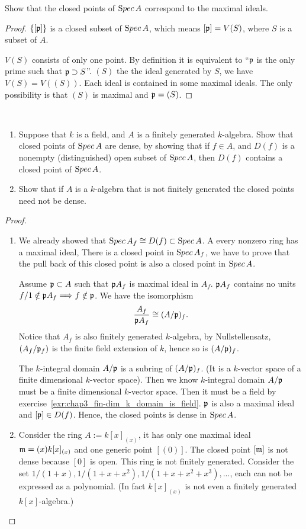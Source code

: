 \documentclass[11pt,fleqn]{book}
\begin{document}
\begin{exr}
Show that the closed points of ${\text Spec\,} A$ correspond to the maximal ideals.
\end{exr}
\begin{proof}
$\{[{\mathfrak p}]\}$ is a closed subset of ${\text Spec\,} A$, which means $[{\mathfrak p}]=V(S)$, where $S$ is a subset of $A$.

$V(S)$ consists of only one point. By definition it is equivalent to ``${\mathfrak p}$ is the only prime such that ${\mathfrak p}\supset S$''. $(S)$ the the ideal generated by $S$, we have $V(S)=V((S))$. Each ideal is contained in some maximal ideals. The only possibility is that $(S)$ is maximal and ${\mathfrak p}=(S)$.
\end{proof}

\begin{exr}\ 
\begin{enumerate}[label=(\alph*)]
\item 
Suppose that $k$ is a field, and $A$ is a finitely generated $k$-algebra. Show that closed points of ${\text Spec\,} A $ are dense, by showing that if $f \in A$, and $D(f)$ is a nonempty (distinguished) open subset of ${\text Spec\,} A$, then $D(f)$ contains a closed point of ${\text Spec\,} A$. 
\item Show that if $A$ is a $k$-algebra that is not finitely generated the closed points need not be dense. 
\end{enumerate}
\end{exr}
\begin{proof}
\begin{enumerate}[label=(\alph*)]
\item 
We already showed that ${\text Spec\,} A_f\cong D(f)\subset {\text Spec\,} A$. A every nonzero ring has a maximal ideal, There is a closed point in ${\text Spec\,} A_f$, we have to prove that the pull back of this closed point is also a closed point in ${\text Spec\,} A$.

Assume ${\mathfrak p}\subset A$ such that ${\mathfrak p} A_f$ is  maximal ideal in $A_f$. ${\mathfrak p} A_f$ contains no units $f/1\notin{\mathfrak p} A_f\Longrightarrow f\notin{\mathfrak p}$. We have the isomorphism 
$$
\frac{A_f}{{\mathfrak p} A_f}\cong (A/{\mathfrak p})_{f}.
$$
Notice that $A_f$ is also finitely generated $k$-algebra, by Nullstellensatz, $(A_f/{\mathfrak p}_f)$ is the finite field extension of $k$, hence so is $(A/{\mathfrak p})_f$.

The $k$-integral domain $A/{\mathfrak p}$ is a subring of $(A/{\mathfrak p})_f$. (It is a $k$-vector space of a finite dimensional $k$-vector space). Then we know $k$-integral domain $A/{\mathfrak p}$ must be a finite dimensional $k$-vector space. Then it must be a field by exercise~\ref{exr:chap3_fin-dim_k_domain_is_field}.
${\mathfrak p}$ is also a maximal ideal and $[{\mathfrak p}]\in D(f)$. Hence, the closed points is dense in ${\text Spec\,} A$.
\item Consider the ring $A:=k[x]_{(x)}$, it has only one maximal ideal ${\mathfrak m}=(x)k[x]_{(x)}$ and one generic point $[(0)]$. The closed point $[{\mathfrak m}]$ is not dense because ${[0]}$ is open. This ring is not finitely generated. Consider the set $1/(1+x), 1/(1+x+x^2),1/(1+x+x^2+x^3),...$, each can not be expressed as a polynomial. (In fact $k[x]_{(x)}$ is not even a finitely generated $k[x]$-algebra.)
\end{enumerate}
\end{proof}
\end{document}
